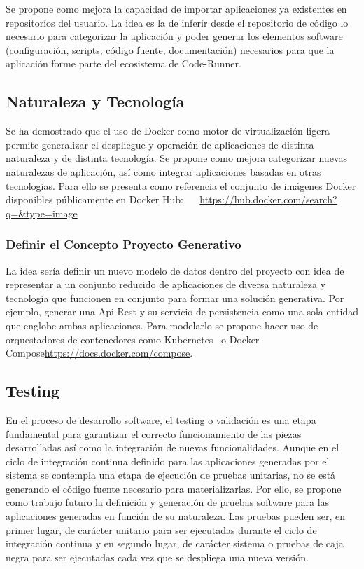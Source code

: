 \documentclass[a4paper,11pt]{book}
\begin{document}
Se propone como mejora la capacidad de importar aplicaciones ya existentes en repositorios del usuario. La idea es la de inferir desde el repositorio de código lo necesario para categorizar la aplicación y  poder generar los elementos software (configuración, scripts, código fuente, documentación) necesarios para que la aplicación forme parte del ecosistema de Code-Runner.  

\subsection{Naturaleza y Tecnología}

Se ha demostrado que el  uso de Docker como motor de virtualización ligera permite generalizar el despliegue y operación de aplicaciones de distinta naturaleza y de distinta tecnología. Se propone como mejora categorizar nuevas naturalezas de aplicación, así como integrar aplicaciones basadas en otras tecnologías. Para ello se presenta como referencia el conjunto de imágenes Docker disponibles públicamente en Docker Hub: ~\cite{dhub}    ~\url{https://hub.docker.com/search?q=&type=image}

\subsubsection{Definir el Concepto Proyecto Generativo}

La idea sería definir un nuevo modelo de datos dentro del proyecto con idea de representar a un conjunto reducido de aplicaciones de diversa naturaleza y tecnología que funcionen en conjunto para formar una solución generativa. Por ejemplo, generar una Api-Rest y su servicio de persistencia como una sola entidad que englobe ambas aplicaciones. Para modelarlo se propone hacer uso de orquestadores de contenedores como Kubernetes~\cite{kube} o Docker-Compose\url{https://docs.docker.com/compose}.  

\subsection{Testing}

 En el proceso de desarrollo software, el testing o validación es una etapa fundamental para garantizar el correcto funcionamiento de las piezas desarrolladas así como la integración de nuevas funcionalidades. Aunque en el ciclo de integración continua definido para las aplicaciones generadas por el sistema se contempla una etapa de ejecución de pruebas unitarias, no se está generando el código fuente necesario para materializarlas. Por ello, se propone como trabajo futuro la definición y generación de pruebas software para las aplicaciones generadas en función de su naturaleza. Las pruebas pueden ser, en primer lugar, de carácter unitario para ser ejecutadas durante el ciclo de integración continua y en segundo lugar, de carácter sistema o pruebas de caja negra para ser ejecutadas cada vez que se despliega una nueva versión. 
\end{document}
